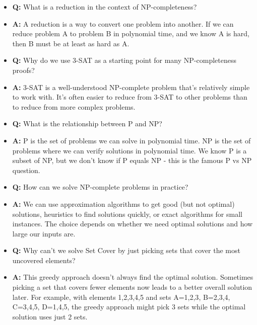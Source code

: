 \documentclass[11pt,a4paper]{article}
\begin{document}
\begin{multicols}{2}
\begin{itemize}
    \item \textbf{Q:} What is a reduction in the context of NP-completeness?
    \item \textbf{A:} A reduction is a way to convert one problem into another. If we can reduce problem A to problem B in polynomial time, and we know A is hard, then B must be at least as hard as A.

    \item \textbf{Q:} Why do we use 3-SAT as a starting point for many NP-completeness proofs?
    \item \textbf{A:} 3-SAT is a well-understood NP-complete problem that's relatively simple to work with. It's often easier to reduce from 3-SAT to other problems than to reduce from more complex problems.

    \item \textbf{Q:} What is the relationship between P and NP?
    \item \textbf{A:} P is the set of problems we can solve in polynomial time. NP is the set of problems where we can verify solutions in polynomial time. We know P is a subset of NP, but we don't know if P equals NP - this is the famous P vs NP question.

    \item \textbf{Q:} How can we solve NP-complete problems in practice?
    \item \textbf{A:} We can use approximation algorithms to get good (but not optimal) solutions, heuristics to find solutions quickly, or exact algorithms for small instances. The choice depends on whether we need optimal solutions and how large our inputs are.

    \item \textbf{Q:} Why can't we solve Set Cover by just picking sets that cover the most uncovered elements?
    \item \textbf{A:} This greedy approach doesn't always find the optimal solution. Sometimes picking a set that covers fewer elements now leads to a better overall solution later. For example, with elements {1,2,3,4,5} and sets A={1,2,3}, B={2,3,4}, C={3,4,5}, D={1,4,5}, the greedy approach might pick 3 sets while the optimal solution uses just 2 sets.
\end{itemize}

\end{multicols}
\end{document}
